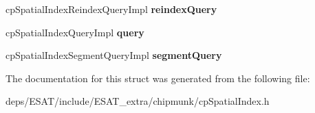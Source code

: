 \begin{DoxyCompactItemize}
\item 
\mbox{\label{structcp_spatial_index_class_a60088d6e38cafcba2fde0c41086be83a}} 
cp\+Spatial\+Index\+Reindex\+Query\+Impl {\bfseries reindex\+Query}
\item 
\mbox{\label{structcp_spatial_index_class_a92ef2e203e2f5162ce7d673a6d538377}} 
cp\+Spatial\+Index\+Query\+Impl {\bfseries query}
\item 
\mbox{\label{structcp_spatial_index_class_a02bf5963d4fdba46b3ecaa689b24d5cd}} 
cp\+Spatial\+Index\+Segment\+Query\+Impl {\bfseries segment\+Query}
\end{DoxyCompactItemize}


The documentation for this struct was generated from the following file\+:\begin{DoxyCompactItemize}
\item 
deps/\+E\+S\+A\+T/include/\+E\+S\+A\+T\+\_\+extra/chipmunk/cp\+Spatial\+Index.\+h\end{DoxyCompactItemize}
